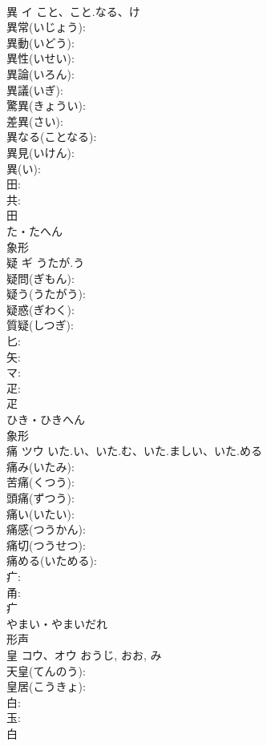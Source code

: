 \documentclass[8pt]{extreport}
\begin{document}
\begin{CJK}{UTF8}{min}
\\	異	イ	こと、こと.なる、け		
\\	異常(いじょう): 
\\	異動(いどう): 
\\	異性(いせい): 
\\	異論(いろん): 
\\	異議(いぎ): 
\\	驚異(きょうい): 
\\	差異(さい): 
\\	異なる(ことなる): 
\\	異見(いけん): 
\\	異(い): 
\\	田: 
\\	共: 
\\	田	
\\	た・たへん	
\\	象形 
\\	疑	ギ	うたが.う		
\\	疑問(ぎもん): 
\\	疑う(うたがう): 
\\	疑惑(ぎわく): 
\\	質疑(しつぎ): 
\\	匕: 
\\	矢: 
\\	マ: 
\\	疋: 
\\	疋	
\\	ひき・ひきへん	
\\	象形 
\\	痛	ツウ	いた.い、いた.む、いた.ましい、いた.める		
\\	痛み(いたみ): 
\\	苦痛(くつう): 
\\	頭痛(ずつう): 
\\	痛い(いたい): 
\\	痛感(つうかん): 
\\	痛切(つうせつ): 
\\	痛める(いためる): 
\\	疒: 
\\	甬: 
\\	疒	
\\	やまい・やまいだれ	
\\	形声 
\\	皇	コウ、オウ		おうじ, おお, み	
\\	天皇(てんのう): 
\\	皇居(こうきょ): 
\\	白: 
\\	玉: 
\\	白	

\end{CJK}
\end{document}
